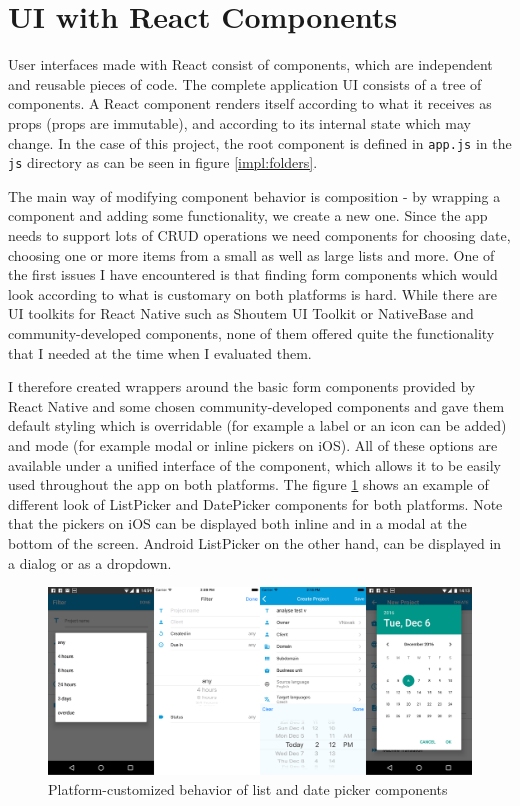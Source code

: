 \section{UI with React Components}

User interfaces made with React consist of components, which are independent and reusable pieces of code. The complete application UI consists of a tree of components. A React component renders itself according to what it receives as props (props are immutable), and according to its internal state which may change. In the case of this project, the root component is defined in \texttt{app.js} in the \texttt{js} directory as can be seen in figure \ref{impl:folders}.

The main way of modifying component behavior is composition - by wrapping a component and adding some functionality, we create a new one. Since the app needs to support lots of CRUD operations we need components for choosing date, choosing one or more items from a small as well as large lists and more. One of the first issues I have encountered is that finding form components which would look according to what is customary on both platforms is hard. While there are UI toolkits for React Native such as Shoutem UI Toolkit or NativeBase and community-developed components, none of them offered quite the functionality that I needed at the time when I evaluated them.

I therefore created wrappers around the basic form components provided by React Native and some chosen community-developed components and gave them default styling which is overridable (for example a label or an icon can be added) and mode (for example modal or inline pickers on iOS). All of these options are available under a unified interface of the component, which allows it to be easily used throughout the app on both platforms. The figure \ref{components} shows an example of different look of ListPicker and DatePicker components for both platforms. Note that the pickers on iOS can be displayed both inline and in a modal at the bottom of the screen. Android ListPicker on the other hand, can be displayed in a dialog or as a dropdown.

\begin{figure}[H]
	\includegraphics[width=1\textwidth]{pics/components}
	\caption{Platform-customized behavior of list and date picker components}
	\label{components}
\end{figure}

